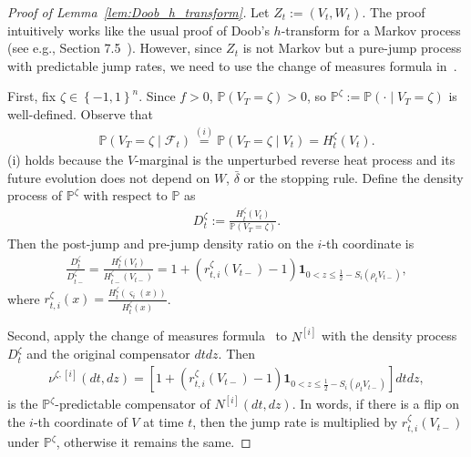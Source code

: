 \documentclass[11pt]{article}
\newcommand{\flip}{\varsigma}
\newcommand{\bdelta}{\bar{\delta}}
\newcommand{\sF}{\mathscr{F}}
\newcommand{\uV}{V}
\newcommand{\uW}{W}
\newcommand{\Ni}{N^{[i]}}
\theoremstyle{named}
\theoremstyle{plain}
\newcommand{\defn}{:=}
\newcommand{\Prob}{\ensuremath{{\mathbb{P}}}}
\newcommand{\brackets}[1]{\left[ #1 \right]}
\newcommand{\parenth}[1]{\left( #1 \right)}
\newcommand{\braces}[1]{\left\{ #1 \right \}}
\begin{document}
\begin{proof}[Proof of Lemma~\ref{lem:Doob_h_transform}] 
  Let $Z_t \defn (\uV_t, \uW_t)$. The proof intuitively works like the usual proof of Doob's $h$-transform for a Markov process (see e.g., Section 7.5~\cite{sarkka2019applied}). However, since $Z_t$ is not Markov but a pure-jump process with predictable jump rates, we need to use the change of measures formula in~\cite[Chapter III]{jacod2013limit}.

  First, fix $\zeta \in \braces{-1, 1}^n$. Since $f > 0$, $\Prob(\uV_T = \zeta) > 0$, so $\Prob^\zeta \defn \Prob(\cdot \mid \uV_{T} = \zeta)$ is well-defined. Observe that 
  \begin{align*}
    \Prob(\uV_T = \zeta \mid \sF_t) \overset{(i)}{=} \Prob(\uV_T = \zeta \mid \uV_t) = H_t^{\zeta}(\uV_t).
  \end{align*}
  (i) holds because the $\uV$-marginal is the unperturbed reverse heat process and its future evolution does not depend on $\uW$, $\bdelta$ or the stopping rule. Define the density process of $\Prob^\zeta$ with respect to $\Prob$ as
  \begin{align*}
    D_t^{\zeta} \defn \frac{H_t^{\zeta}(\uV_t)}{\Prob(\uV_T = \zeta)}. 
  \end{align*}
  Then the post-jump and pre-jump density ratio on the $i$-th coordinate is
  \begin{align*}
    \frac{D_t^{\zeta}}{D_{t-}^{\zeta}} = \frac{H_t^{\zeta}(\uV_t)}{H_{t-}^{\zeta}(\uV_{t-})} = 1 + \parenth{r^{\zeta}_{t, i}(\uV_{t-}) - 1} \mathbf{1}_{0 < z \leq \frac12 - S_i(\rho_t \uV_{t-})},
  \end{align*}
  where $r^{\zeta}_{t, i}(x) = \frac{H_t^{\zeta}(\flip_i(x))}{H_{t}^{\zeta}(x)}$.

  Second, apply the change of measures formula~\cite[Chapter III, Theorem 3.17]{jacod2013limit} to $\Ni$ with the density process $D_t^{\zeta}$ and the original compensator $dtdz$. Then
  \begin{align*}
    \nu^{\zeta, [i]}(dt, dz) = \brackets{1 + \parenth{r^{\zeta}_{t, i}(\uV_{t-}) - 1} \mathbf{1}_{0 < z \leq \frac12 - S_i(\rho_t \uV_{t-})}} dt dz,
  \end{align*}
  is the $\Prob^{\zeta}$-predictable compensator of $\Ni(dt, dz)$. 
  In words, if there is a flip on the $i$-th coordinate of $\uV$ at time $t$, then the jump rate is multiplied by $r^{\zeta}_{t, i}(\uV_{t-})$ under $\Prob^\zeta$, otherwise it remains the same. 


\end{proof}
\end{document}
